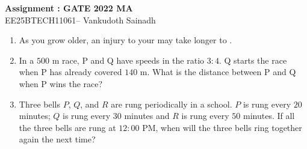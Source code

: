 \documentclass[journal,12pt,onecolumn]{IEEEtran}
\theoremstyle{remark}
\begin{document}
\begin{center}
\LARGE \textbf{Assignment : GATE 2022 MA}\\[2pt] 
\large EE25BTECH11061-- Vankudoth Sainadh
\end{center}

\begin{enumerate}
   \item As you grow older, an injury to your \underline{\hspace{2cm}} may take longer to \underline{\hspace{2cm}}.

\hfill{}

\begin{enumerate}
\end{enumerate}


\item In a $500$ m race, P and Q have speeds in the ratio $3 \colon 4$. Q starts the race when P has already covered $140$ m. What is the distance between P and Q  when P wins the race?

\hfill{}

\begin{enumerate}
\end{enumerate}
\item Three bells $P$, $Q$, and $R$ are rung periodically in a school. $P$ is rung every $20$ minutes; $Q$ is rung every $30$ minutes and $R$ is rung every $50$ minutes. If all the three bells are rung at $12\colon 00$ PM, when will the three bells ring together again the next time?

\hfill{}

\begin{enumerate}
\end{enumerate}


\end{enumerate}
\end{document}
